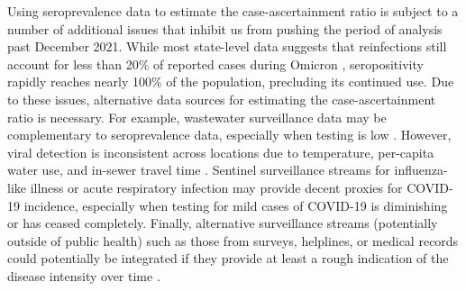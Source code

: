 
Using seroprevalence data to estimate the case-ascertainment ratio is subject to
a number of additional issues that inhibit us from pushing the period of
analysis past December 2021. While most state-level data suggests that
reinfections still account for less than 20\% of reported cases during Omicron
\citep{ruff2022rapid, nyreinfect2021, hireinfect2022, wareinfect2022},
seropositivity rapidly reaches nearly 100\% of the population, precluding its
continued use. Due to these issues, alternative data sources for estimating the
case-ascertainment ratio is necessary. For example, wastewater surveillance data
may be complementary to seroprevalence data, especially when testing is low
\citep{mcmanus2023predicting}. However, viral detection is inconsistent across
locations due to temperature, per-capita water use, and in-sewer travel time
\citep{mcmanus2023predicting, hart2020computational, li2023correlation}.
Sentinel surveillance streams for influenza-like illness or acute respiratory
infection may provide decent proxies for COVID-19 incidence, especially when
testing for mild cases of COVID-19 is diminishing or has ceased completely.
Finally, alternative surveillance streams (potentially outside of public health)
such as those from surveys, helplines, or medical records could potentially be
integrated if they provide at least a rough indication of the disease intensity
over time \citep{reinhart2021open,ecdc2020strategies}.



